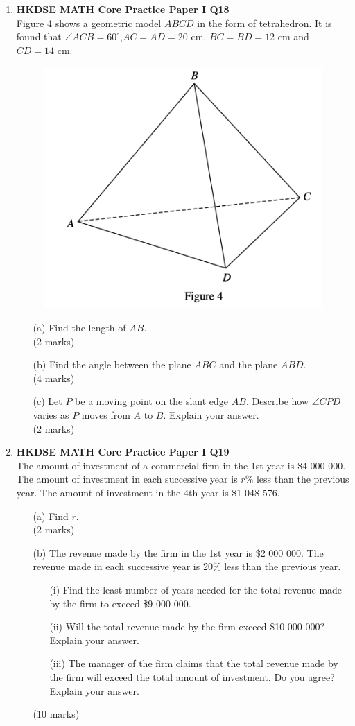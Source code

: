 \documentclass[12pt]{article}
\begin{document}
\begin{enumerate}
	\item \textbf{HKDSE MATH Core Practice Paper I Q18}\\
	Figure 4 shows a geometric model $ABCD$ in the form of tetrahedron. It is found that $\angle ACB = 60^\circ$,$AC = AD = 20$ cm, $BC = BD = 12$ cm and $CD = 14$ cm.
	\begin{figure}[H]
		\centering
		\includegraphics[width = .5\linewidth]{PPFigure1.4}
	\end{figure}
	\begin{enumerate}
		\item[(a)] Find the length of $AB$. \\(2 marks)
		\item[(b)] Find the angle between the plane $ABC$ and the plane $ABD$. \\(4 marks)
		\item[(c)] Let $P$ be a moving point on the slant edge $AB$. Describe how $\angle CPD$ varies as $P$ moves from $A$ to $B$. Explain your answer. \\(2 marks)
	\end{enumerate}

	\item \textbf{HKDSE MATH Core Practice Paper I Q19}\\
	The amount of investment of a commercial firm in the 1st year is \$4 000 000. The amount of investment in each successive year is $r \%$ less than the previous year. The amount of investment in the 4th year is \$1 048 576.
	\begin{enumerate}
		\item[(a)] Find $r$. \\(2 marks)
		\item[(b)] The revenue made by the firm in the 1st year is \$2 000 000. The revenue made in each successive year is 20\% less than the previous year.
		\begin{enumerate}
			\item[(i)] Find the least number of years needed for the total revenue made by the firm to exceed \$9 000 000.
			\item[(ii)] Will the total revenue made by the firm exceed \$10 000 000? Explain your answer.
			\item[(iii)] The manager of the firm claims that the total revenue made by the firm will exceed the total amount of investment. Do you agree? Explain your answer.	
		\end{enumerate}
		(10 marks)
	\end{enumerate}
\end{enumerate}
\end{document}
